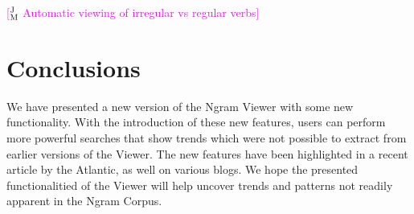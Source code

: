 \documentclass[11pt,a4paper]{article}
\newcommand{\jmcomment}[1]{\textcolor{magenta}{[$^{\textsc{J}}_{\textsc{M}}$ #1]}}
\newcommand{\eat}[1]{\ignorespaces}
\begin{document}
\jmcomment{Automatic viewing of irregular vs regular verbs}




\section{Conclusions}
We have presented a new version of the Ngram Viewer with some new functionality. With the introduction of these new features, users can perform more powerful searches that show trends which were not possible to extract from earlier versions of the Viewer. The new features have been highlighted in a recent article by the Atlantic, as well on various blogs.
We hope the presented functionalitied of the Viewer will help uncover trends and patterns not readily apparent in the Ngram Corpus.

\eat{\jmcomment{Blog posts/entries from the internet:
http://sciencerefinery.com/2013/10/28/google-ngram-viewer-now-more-powerful-than-ever/
http://www.devingriffiths.com/google-books/google-n-gram-studies/
http://languagelog.ldc.upenn.edu/nll/?p=8472
http://www.textualscholarship.nl/?p=14051}}

\eat{\section{Acknowledgements}
We would like to thank John DeNero, ...}



\end{document}
